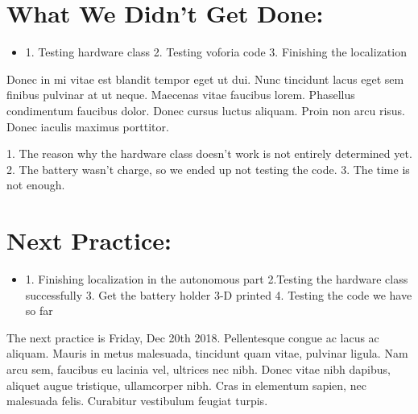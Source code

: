 \documentclass[12pt]{article}
\begin{document}
\section{What We Didn't Get Done:} %
\begin{itemize}
	\item 1. Testing hardware class 
	         2. Testing voforia code
	         3. Finishing the localization
\end{itemize}

Donec in mi vitae est blandit tempor eget ut dui. Nunc tincidunt lacus eget sem finibus pulvinar at ut neque. Maecenas vitae faucibus lorem. Phasellus condimentum faucibus dolor. Donec cursus luctus aliquam. Proin non arcu risus. Donec iaculis maximus porttitor.

1. The reason why the hardware class doesn't work is not entirely determined yet.
2. The battery wasn't charge, so we ended up not testing the code.
3. The time is not enough. 

\section{Next Practice:}
\begin{itemize}
	\item 1. Finishing localization in the autonomous part
	          2.Testing the hardware class successfully 
	          3. Get the battery holder 3-D printed
	          4. Testing the code we have so far
\end{itemize}

The next practice is Friday, Dec 20th 2018. %
Pellentesque congue ac lacus ac aliquam. Mauris in metus malesuada, tincidunt quam vitae, pulvinar ligula. Nam arcu sem, faucibus eu lacinia vel, ultrices nec nibh. Donec vitae nibh dapibus, aliquet augue tristique, ullamcorper nibh. Cras in elementum sapien, nec malesuada felis. Curabitur vestibulum feugiat turpis. 
\end{document}
